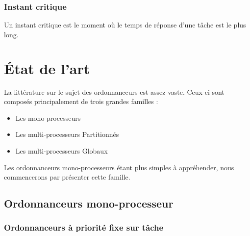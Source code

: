 \documentclass[11pt,a4paper,oneside]{report}
\begin{document}
	\subsection{Instant critique}
	\label{instantcritique}
	Un instant critique est le moment où le temps de réponse d'une tâche est le plus long.
	
	
	
	\chapter{État de l'art}
	
	La littérature sur le sujet des ordonnanceurs est assez vaste. 
	Ceux-ci sont composés principalement de trois grandes familles :\medskip
	\begin{itemize}
		\item Les mono-processeurs
		\item Les multi-processeurs Partitionnés
		\item Les multi-processeurs Globaux
	\end{itemize}
	Les ordonnanceurs mono-processeurs étant plus simples à appréhender, nous commencerons 
	par présenter cette famille.
	
	\section{Ordonnanceurs mono-processeur}
	\subsection{Ordonnanceurs à priorité fixe sur tâche}
	
\end{document}
